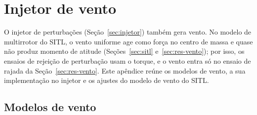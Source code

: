 \chapter{Injetor de vento}
\label{ap:vento}

O injetor de perturbações (Seção~\ref{sec:injetor}) também gera vento. No
modelo de multirrotor do SITL, o vento uniforme age como força no centro de
massa e quase não produz momento de atitude
(Seções~\ref{sec:sitl} e~\ref{sec:res-vento}); por isso, os ensaios de
rejeição de perturbação usam o torque, e o vento entra só no ensaio de rajada
da Seção~\ref{sec:res-vento}. Este apêndice reúne os modelos de vento, a sua
implementação no injetor e os ajustes do modelo de vento do SITL.

\section{Modelos de vento}
\label{ap:vento-modelos}

